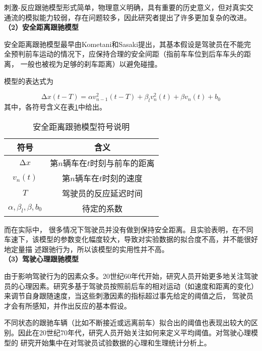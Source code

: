 刺激-反应跟驰模型形式简单，物理意义明确，具有重要的历史意义，但对真实交通流的模拟能力较弱，存在问题较多，因此研究者提出了许多更加复杂的改进。 \\

\noindent \textbf{（2）安全距离跟驰模型}

安全距离跟驰模型最早由Kometani和Sasaki\cite{ckome1958on}提出，其基本假设是驾驶员在不能完全预判前车运动的情况下，应保持合理的安全间距（指前车车位到后车车头的距离，
一般也被视为足够的刹车距离）以避免碰撞。

模型的表达式为

\begin{equation}
  \increment{x}(t-T) = \alpha v_{n-1}^2(t-T) + \beta_lv_n^2(t) + \beta v_n(t) + b_0
  \label{eq:chap01-3}
\end{equation}
其中，各符号含义在表\ref{tab:chap01-4}中给出。

\begin{table}
  \centering
  \caption{安全距离跟驰模型符号说明}
  \begin{tabular}{cc}
    \toprule
    符号          &  含义                         \\
    \midrule
    $\increment{x}$   & 第$n$辆车在$t$时刻与前车的距离        \\
    $v_n(t)$          & 第$n$辆车在$t$时刻的速度         \\
    $T$        & 驾驶员的反应延迟时间  \\
    $\alpha ,\beta_l , \beta , b_0$        & 待定的系数         \\
    \bottomrule
  \end{tabular}
  \label{tab:chap01-4}
\end{table}

而在实际中， 很多情况下驾驶员并没有做到保持安全距离。且实验表明，在不同车速下，该模型的参数变化幅度较大，导致对实验数据的拟合度不高，并不能很好地定量描
述跟驰行为，所以该模型的实用性并不高。\\

\noindent \textbf{（3）驾驶心理跟驰模型}

由于影响驾驶行为的因素众多。20世纪60年代开始，研究人员开始更多地关注驾驶员的心理因素。研究多基于驾驶员按照前后车的相对运动（如速度和距离的变化）
来调节自身跟随速度，当这些刺激因素的指标超过事先给定的阈值之后， 驾驶员才会有所感知，并作出反应的基本假设。\cite{Todosiev1963the}

不同状态的跟驰车辆（比如不断接近或远离前车）拟合出的阈值也表现出较大的区别。因此在20世纪70年代，研究人员开始关注如何来定义平均阈值。对驾驶心理模型的
研究开始集中在对驾驶员试验数据的心理和生理统计分析上。

